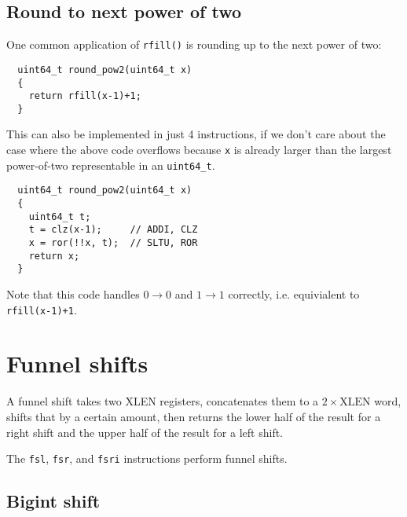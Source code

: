 
\subsection{Round to next power of two}

One common application of {\tt rfill()} is rounding up to the next power of two:

\begin{minipage}{\linewidth}
\begin{verbatim}
  uint64_t round_pow2(uint64_t x)
  {
    return rfill(x-1)+1;
  }
\end{verbatim}
\end{minipage}

This can also be implemented in just 4 instructions, if we don't care about the
case where the above code overflows because {\tt x} is already larger than the
largest power-of-two representable in an {\tt uint64\_t}.

\begin{minipage}{\linewidth}
\begin{verbatim}
  uint64_t round_pow2(uint64_t x)
  {
    uint64_t t;
    t = clz(x-1);     // ADDI, CLZ
    x = ror(!!x, t);  // SLTU, ROR
    return x;
  }
\end{verbatim}
\end{minipage}

Note that this code handles $0\rightarrow{}0$ and $1\rightarrow{}1$ correctly,
i.e. equivialent to {\tt rfill(x-1)+1}.


\section{Funnel shifts}
\label{funnel}

A funnel shift takes two XLEN registers, concatenates them to a $2 \times
\textrm{XLEN}$ word, shifts that by a certain amount, then returns the lower
half of the result for a right shift and the upper half of the result for a
left shift.

The {\tt fsl}, {\tt fsr}, and {\tt fsri} instructions perform funnel shifts.

\subsection{Bigint shift}

